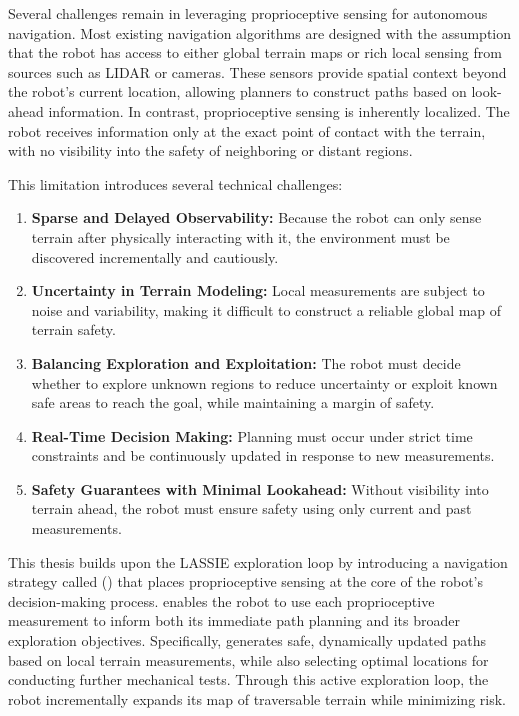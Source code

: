 Several challenges remain in leveraging proprioceptive sensing for autonomous navigation. Most existing navigation algorithms are designed with the assumption that the robot has access to either global terrain maps or rich local sensing from sources such as LIDAR or cameras. These sensors provide spatial context beyond the robot’s current location, allowing planners to construct paths based on look-ahead information. In contrast, proprioceptive sensing is inherently localized. The robot receives information only at the exact point of contact with the terrain, with no visibility into the safety of neighboring or distant regions.

This limitation introduces several technical challenges:

\begin{enumerate}
    \item \textbf{Sparse and Delayed Observability:} Because the robot can only sense terrain after physically interacting with it, the environment must be discovered incrementally and cautiously.
    \item \textbf{Uncertainty in Terrain Modeling:} Local measurements are subject to noise and variability, making it difficult to construct a reliable global map of terrain safety.
    \item \textbf{Balancing Exploration and Exploitation:} The robot must decide whether to explore unknown regions to reduce uncertainty or exploit known safe areas to reach the goal, while maintaining a margin of safety.
    \item \textbf{Real-Time Decision Making:} Planning must occur under strict time constraints and be continuously updated in response to new measurements.
    \item \textbf{Safety Guarantees with Minimal Lookahead:} Without visibility into terrain ahead, the robot must ensure safety using only current and past measurements.
\end{enumerate}

This thesis builds upon the LASSIE exploration loop by introducing a navigation strategy called \textit{\algonamefull{}} (\algoname{}) that places proprioceptive sensing at the core of the robot’s decision-making process. \algoname{} enables the robot to use each proprioceptive measurement to inform both its immediate path planning and its broader exploration objectives. Specifically, \algoname{} generates safe, dynamically updated paths based on local terrain measurements, while also selecting optimal locations for conducting further mechanical tests. Through this active exploration loop, the robot incrementally expands its map of traversable terrain while minimizing risk.

